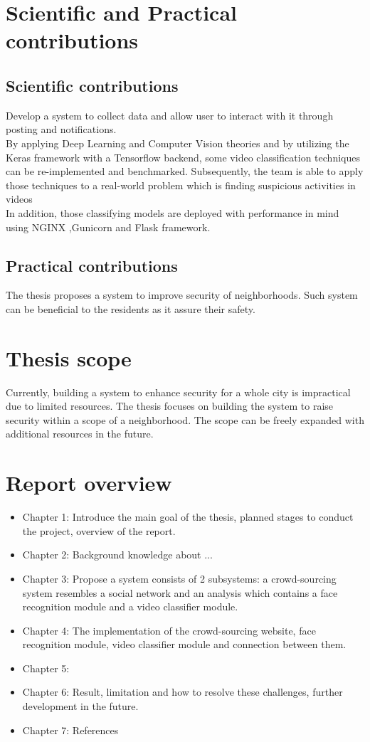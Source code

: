 \section{Scientific and Practical contributions}
\subsection{Scientific contributions}
Develop a system to collect data and allow user to interact with it through posting and notifications. \\
By applying Deep Learning and Computer Vision theories and by utilizing the Keras framework with a Tensorflow backend, some video classification techniques can be re-implemented and benchmarked. Subsequently, the team is able to apply those techniques to a real-world problem which is finding suspicious activities in videos \\ %
In addition, those classifying models are deployed with performance in mind using NGINX ,Gunicorn and Flask framework.
\subsection{Practical contributions}
The thesis proposes a system to improve security of neighborhoods. Such system can be beneficial to the residents as it assure their safety.
\section{Thesis scope}
Currently, building a system to enhance security for a whole city is impractical due to limited resources. The thesis focuses on building the system to raise security within a scope of a neighborhood. The scope can be freely expanded with additional resources in the future.
\section{Report overview}
\begin{itemize}
	\item Chapter 1: Introduce the main goal of the thesis, planned stages to conduct the project, overview of the report.
	\item Chapter 2: Background knowledge about ...
	\item Chapter 3: Propose a system consists of 2 subsystems: a crowd-sourcing system resembles a social network and an analysis which contains a face recognition module and a video classifier module. 
	\item Chapter 4: The implementation of the crowd-sourcing website, face recognition module, video classifier module and connection between them.
	\item Chapter 5: 
	\item Chapter 6: Result, limitation and how to resolve these challenges, further development in the future.
	\item Chapter 7: References
\end{itemize} 
